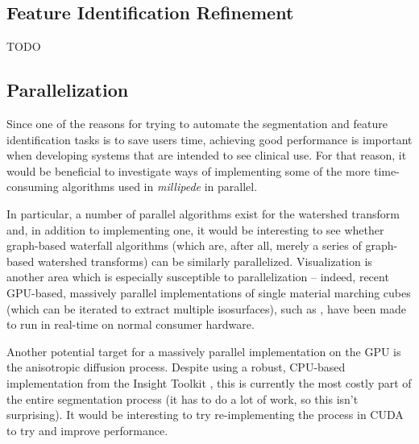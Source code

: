 \subsection{Feature Identification Refinement}

TODO

\subsection{Parallelization}

Since one of the reasons for trying to automate the segmentation and feature identification tasks is to save users time, achieving good performance is important when developing systems that are intended to see clinical use. For that reason, it would be beneficial to investigate ways of implementing some of the more time-consuming algorithms used in \emph{millipede} in parallel.

In particular, a number of parallel algorithms exist for the watershed transform \cite{?} and, in addition to implementing one, it would be interesting to see whether graph-based waterfall algorithms (which are, after all, merely a series of graph-based watershed transforms) can be similarly parallelized. Visualization is another area which is especially susceptible to parallelization -- indeed, recent GPU-based, massively parallel implementations of single material marching cubes (which can be iterated to extract multiple isosurfaces), such as \cite{dyken08}, have been made to run in real-time on normal consumer hardware.

Another potential target for a massively parallel implementation on the GPU is the anisotropic diffusion process. Despite using a robust, CPU-based implementation from the Insight Toolkit \cite{?}, this is currently the most costly part of the entire segmentation process (it has to do a lot of work, so this isn't surprising). It would be interesting to try re-implementing the process in CUDA \cite{?} to try and improve performance.
